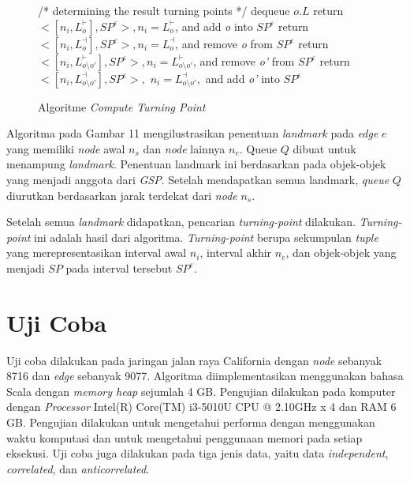 \documentclass[conference]{IEEEtran}
\begin{document}
\begin{figure}
\begin{algorithm}[H]
\begin{algorithmic}[1]
			\State /* determining the result turning points */
			\State dequeue $ o.L $
			\State return $ < [n_i, L_o^\vdash], SP^\varepsilon >, n_i =  L_o^\vdash $,
			\State and add \textit{o} into $ SP^\varepsilon $
			\EndIf
			\EndCase
			\State return $ < [n_i, L_o^\dashv], SP^\varepsilon >, n_i =  L_o^\dashv $,
			\State and remove \textit{o} from $ SP^\varepsilon $
			\EndIf
			\EndCase
			\State return $ < [n_i, L_{o \setminus o'}^\vdash], SP^\varepsilon >, n_i = L_{o \setminus o'}^\vdash $,
			\State and remove \textit{o'} from $ SP^\varepsilon $
			\EndIf
			\EndCase
			\Otherwise{}
			\State return $ < [n_i, L_{o \setminus o'}^\dashv], SP^\varepsilon >, $
			\State $ n_i = L_{o \setminus o'}^\dashv, $ and add \textit{o'} into $ SP^\varepsilon $
			\EndIf
			\EndOtherwise
			\EndSwitch
			\EndWhile
		\end{algorithmic}
	\end{algorithm}
	\caption{Algoritme \textit{Compute Turning Point}}
\end{figure}

Algoritma pada Gambar 11 mengilustrasikan penentuan \textit{landmark} pada \textit{edge} $ e $ yang memiliki \textit{node} awal $ n_s $ dan \textit{node} lainnya $ n_e $. Queue $ Q $ dibuat untuk menampung \textit{landmark}. Penentuan landmark ini berdasarkan pada objek-objek yang menjadi anggota dari \textit{GSP}. Setelah mendapatkan semua landmark, \textit{queue} $ Q $ diurutkan berdasarkan jarak terdekat dari \textit{node} $ n_s $.

Setelah semua \textit{landmark} didapatkan, pencarian \textit{turning-point} dilakukan. \textit{Turning-point} ini adalah hasil dari algoritma. \textit{Turning-point} berupa sekumpulan \textit{tuple} yang merepresentasikan interval awal $ n_i $, interval akhir $ n_e $, dan objek-objek yang menjadi $ SP $ pada interval tersebut $ SP^\varepsilon $.

\section{Uji Coba}
Uji coba dilakukan pada jaringan jalan raya California\cite{ontrip} dengan \textit{node} sebanyak 8716 dan \textit{edge} sebanyak 9077. Algoritma diimplementasikan menggunakan bahasa Scala dengan \textit{memory heap} sejumlah 4 GB. Pengujian dilakukan pada komputer dengan \textit{Processor} Intel(R) Core(TM) i3-5010U CPU @ 2.10GHz x 4 dan RAM 6 GB. Pengujian dilakukan untuk mengetahui performa dengan menggunakan waktu komputasi dan untuk mengetahui penggunaan memori pada setiap eksekusi. Uji coba juga dilakukan pada tiga jenis data, yaitu data \textit{independent}, \textit{correlated}, dan \textit{anticorrelated}.
\end{document}
